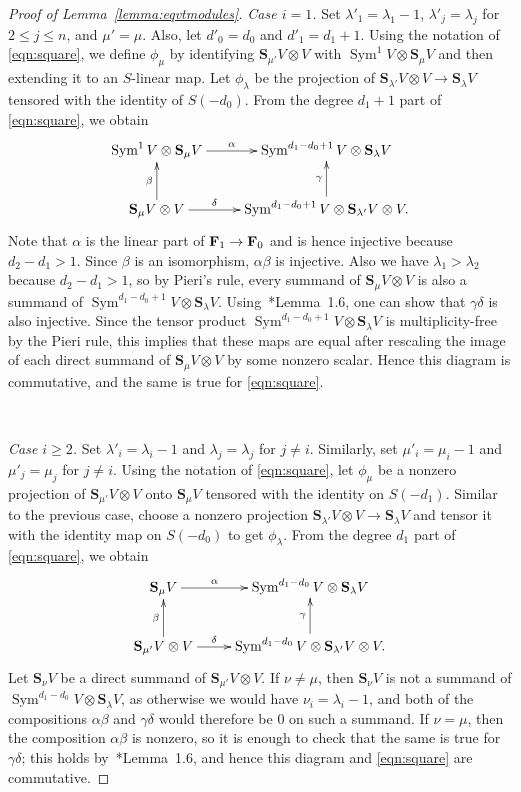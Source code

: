 \documentclass[12pt]{amsart}
\theoremstyle{definition}
\newcommand{\Sc}{\mathbf{S}}
\newcommand{\Sym}{\operatorname{Sym}}
\begin{document}
\begin{proof}[Proof of Lemma~\ref{lemma:eqvtmodules}]
  \noindent \emph{Case $i=1$.} Set $\lambda'_1 = \lambda_1 - 1$,
  $\lambda'_j = \lambda_j$ for $2 \le j \le n$, and $\mu' =
  \mu$. Also, let $d'_0 = d_0$ and $d'_1 = d_1 + 1$. Using the
  notation of \eqref{eqn:square}, we define $\phi_\mu$ by identifying
  $\Sc_{\mu'} V \otimes V$ with $\Sym^1 V \otimes \Sc_\mu V$ and then
  extending it to an $S$-linear map. Let $\phi_\lambda$ be 
  the projection of $\Sc_{\lambda'} V \otimes V \to \Sc_\lambda V$
  tensored with the identity of $S(-d_0)$. From the degree $d_1 + 1$
  part of \eqref{eqn:square}, we obtain
  \[
  \xymatrix{ \Sym^1 V \otimes \Sc_\mu V \ar[r]^-\alpha & \Sym^{d_1 -
      d_0 + 1} V  \otimes \Sc_\lambda V \\
    \Sc_\mu V \otimes V \ar[r]^-\delta \ar[u]^-\beta & \Sym^{d_1 - d_0
      + 1} V \otimes \Sc_{\lambda'} V \otimes V \ar[u]^-\gamma. }
  \]
  Note that $\alpha$ is the linear part of ${\bf F}_1 \to {\bf F}_0$
  and is hence injective because $d_2 - d_1 > 1$. 
  Since $\beta$ is an isomorphism, $\alpha \beta$ is injective. 
  Also we have $\lambda_1 >
  \lambda_2$ because $d_2 - d_1 > 1$, so by Pieri's rule, every summand
  of $\Sc_\mu V \otimes V$ is also a summand of $\Sym^{d_1 - d_0 + 1}
  V \otimes \Sc_\lambda V$. Using~\cite{sam}*{Lemma~1.6}, one can show
  that $\gamma \delta$ is also injective. Since the tensor product
  $\Sym^{d_1 - d_0 + 1} V \otimes \Sc_\lambda V$ is multiplicity-free
  by the Pieri rule, this implies that these maps are equal after
  rescaling the image of each direct summand of $\Sc_\mu V \otimes V$
  by some nonzero scalar. Hence this diagram is commutative, and the
  same is true for \eqref{eqn:square}.


  ~

  \noindent \emph{Case $i \ge 2$.} Set $\lambda'_i =
  \lambda_i - 1$ and $\lambda_j = \lambda_j$ for $j \ne i$. 
  Similarly, set $\mu'_i = \mu_i - 1$ and $\mu'_j = \mu_j$ for $j \ne i$. 
  Using the notation of \eqref{eqn:square}, let $\phi_\mu$ 
  be a nonzero projection of $\Sc_{\mu'} V \otimes V$ onto $\Sc_\mu V$
  tensored with the identity on $S(-d_1)$. Similar to the previous case, 
  choose a nonzero projection $\Sc_{\lambda'} V \otimes V \to \Sc_\lambda V$
  and tensor it with the identity map on $S(-d_0)$ to get
  $\phi_\lambda$. From the degree $d_1$ part of
  \eqref{eqn:square}, we obtain
  \[
  \xymatrix{ \Sc_\mu V \ar[r]^-\alpha & \Sym^{d_1 - d_0} V \otimes
    \Sc_\lambda V \\
    \Sc_{\mu'} V \otimes V \ar[r]^-\delta \ar[u]^-\beta & \Sym^{d_1 -
      d_0} V \otimes \Sc_{\lambda'} V \otimes V \ar[u]^-\gamma. }
  \]
  Let $\Sc_\nu V$ be a direct summand of $\Sc_{\mu'} V \otimes V$. If
  $\nu \ne \mu$, then $\Sc_\nu V$ is not a summand of $\Sym^{d_1 -
    d_0} V \otimes \Sc_\lambda V$, as otherwise we would have $\nu_i =
  \lambda_i - 1$, and both of the compositions $\alpha \beta$ and $\gamma
  \delta$ would therefore be 0 on such a summand. If $\nu = \mu$, then the
  composition $\alpha \beta$ is nonzero, so it is enough to check that
  the same is true for $\gamma \delta$; this holds
  by~\cite{sam}*{Lemma~1.6}, and hence this diagram and
  \eqref{eqn:square} are commutative.
  

\end{proof}
\end{document}
